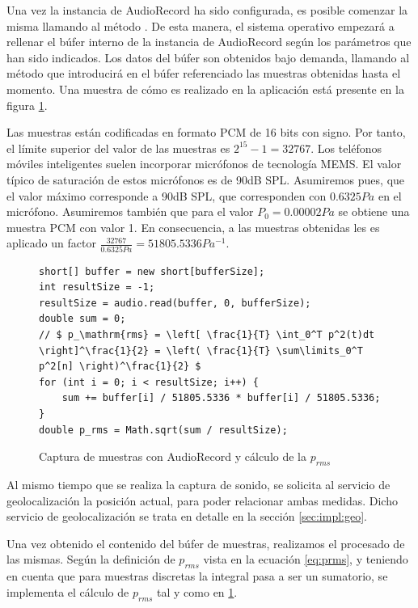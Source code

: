 Una vez la instancia de AudioRecord ha sido configurada, es posible comenzar la misma llamando al método . De esta manera, el sistema operativo empezará a rellenar el búfer interno de la instancia de AudioRecord según los parámetros que han sido indicados. Los datos del búfer son obtenidos bajo demanda, llamando al método  que introducirá en el búfer referenciado las muestras obtenidas hasta el momento. Una muestra de cómo es realizado en la aplicación está presente en la figura \ref{code:audiocapture}. 

Las muestras están codificadas en formato \ac{PCM} de 16 bits con signo. Por tanto, el límite superior del valor de las muestras es $2^15-1=32767$. Los teléfonos móviles inteligentes suelen incorporar micrófonos de tecnología \ac{MEMS}. El valor típico de saturación de estos micrófonos es de 90dB SPL. Asumiremos pues, que el valor máximo  corresponde a 90dB SPL, que corresponden con $0.6325 Pa$ en el micrófono. Asumiremos también que para el valor $P_0=0.00002 Pa$ se obtiene una muestra PCM con valor 1.
En consecuencia, a las muestras obtenidas les es aplicado un factor $\frac{32767}{0.6325 Pa} =  51805.5336 Pa^{-1}$.

\begin{figure}[h] 
\begin{verbatim}
short[] buffer = new short[bufferSize];
int resultSize = -1;
resultSize = audio.read(buffer, 0, bufferSize);
double sum = 0;
// $ p_\mathrm{rms} = \left[ \frac{1}{T} \int_0^T p^2(t)dt \right]^\frac{1}{2} = \left( \frac{1}{T} \sum\limits_0^T p^2[n] \right)^\frac{1}{2} $
for (int i = 0; i < resultSize; i++) {
    sum += buffer[i] / 51805.5336 * buffer[i] / 51805.5336;
}
double p_rms = Math.sqrt(sum / resultSize);
\end{verbatim}
\caption{Captura de muestras con AudioRecord y cálculo de la $p_{rms}$}
\label{code:audiocapture}
\end{figure}

Al mismo tiempo que se realiza la captura de sonido, se solicita al servicio de geolocalización la posición actual, para poder relacionar ambas medidas. Dicho servicio de geolocalización se trata en detalle en la sección \ref{sec:impl:geo}.

Una vez obtenido el contenido del búfer de muestras, realizamos el procesado de las mismas. Según la definición de $p_{rms}$ vista en la ecuación \ref{eq:prms}, y teniendo en cuenta que para muestras discretas la integral pasa a ser un sumatorio, se implementa el cálculo de $p_{rms}$ tal y como en \ref{code:audiocapture}.

